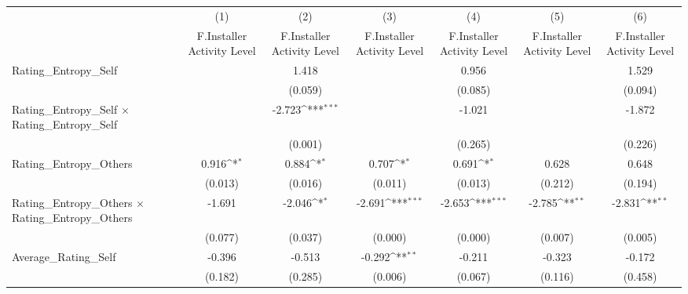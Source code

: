 {
\def\sym#1{\ifmmode^{#1}\else\(^{#1}\)\fi}
\begin{tabular}{l*{6}{c}}
\hline\hline
                    &\multicolumn{1}{c}{(1)}&\multicolumn{1}{c}{(2)}&\multicolumn{1}{c}{(3)}&\multicolumn{1}{c}{(4)}&\multicolumn{1}{c}{(5)}&\multicolumn{1}{c}{(6)}\\
                    &\multicolumn{1}{c}{F.Installer Activity Level}&\multicolumn{1}{c}{F.Installer Activity Level}&\multicolumn{1}{c}{F.Installer Activity Level}&\multicolumn{1}{c}{F.Installer Activity Level}&\multicolumn{1}{c}{F.Installer Activity Level}&\multicolumn{1}{c}{F.Installer Activity Level}\\
\hline
Rating\_Entropy\_Self &                     &       1.418         &                     &       0.956         &                     &       1.529         \\
                    &                     &     (0.059)         &                     &     (0.085)         &                     &     (0.094)         \\
[1em]
Rating\_Entropy\_Self $\times$ Rating\_Entropy\_Self&                     &      -2.723\sym{***}&                     &      -1.021         &                     &      -1.872         \\
                    &                     &     (0.001)         &                     &     (0.265)         &                     &     (0.226)         \\
[1em]
Rating\_Entropy\_Others&       0.916\sym{*}  &       0.884\sym{*}  &       0.707\sym{*}  &       0.691\sym{*}  &       0.628         &       0.648         \\
                    &     (0.013)         &     (0.016)         &     (0.011)         &     (0.013)         &     (0.212)         &     (0.194)         \\
[1em]
Rating\_Entropy\_Others $\times$ Rating\_Entropy\_Others&      -1.691         &      -2.046\sym{*}  &      -2.691\sym{***}&      -2.653\sym{***}&      -2.785\sym{**} &      -2.831\sym{**} \\
                    &     (0.077)         &     (0.037)         &     (0.000)         &     (0.000)         &     (0.007)         &     (0.005)         \\
[1em]
Average\_Rating\_Self &      -0.396         &      -0.513         &      -0.292\sym{**} &      -0.211         &      -0.323         &      -0.172         \\
                    &     (0.182)         &     (0.285)         &     (0.006)         &     (0.067)         &     (0.116)         &     (0.458)         \\

\end{tabular}}
